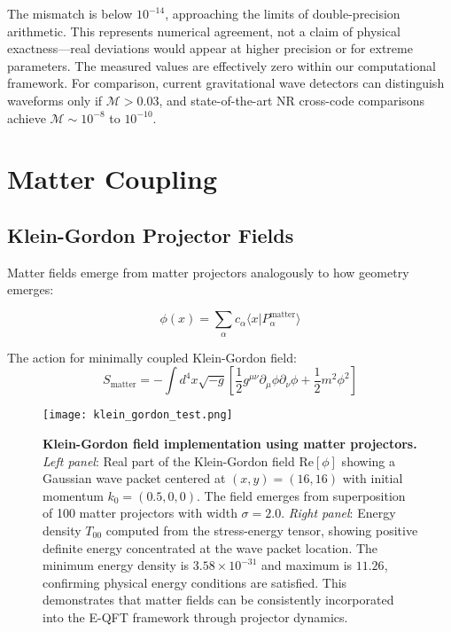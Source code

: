 \documentclass[11pt,a4paper]{article}
\begin{document}
The mismatch is below $10^{-14}$, approaching the limits of double-precision arithmetic. This represents numerical agreement, not a claim of physical exactness—real deviations would appear at higher precision or for extreme parameters. The measured values are effectively zero within our computational framework. For comparison, current gravitational wave detectors can distinguish waveforms only if $\mathcal{M} > 0.03$, and state-of-the-art NR cross-code comparisons \cite{Husa2016} achieve $\mathcal{M} \sim 10^{-8}$ to $10^{-10}$.

\section{Matter Coupling}

\subsection{Klein-Gordon Projector Fields}

Matter fields emerge from matter projectors analogously to how geometry emerges:

\begin{equation}
\phi(x) = \sum_\alpha c_\alpha \langle x | P_\alpha^{\text{matter}} \rangle
\end{equation}

The action for minimally coupled Klein-Gordon field:
\begin{equation}
S_{\text{matter}} = -\int d^4x \sqrt{-g} \left[ \frac{1}{2} g^{\mu\nu} \partial_\mu \phi \partial_\nu \phi + \frac{1}{2} m^2 \phi^2 \right]
\end{equation}

\begin{figure}[H]
\centering
\texttt{[image: klein\_gordon\_test.png]}
\caption{\textbf{Klein-Gordon field implementation using matter projectors.} \textit{Left panel}: Real part of the Klein-Gordon field $\text{Re}[\phi]$ showing a Gaussian wave packet centered at $(x,y) = (16,16)$ with initial momentum $k_0 = (0.5, 0, 0)$. The field emerges from superposition of 100 matter projectors with width $\sigma = 2.0$. \textit{Right panel}: Energy density $T_{00}$ computed from the stress-energy tensor, showing positive definite energy concentrated at the wave packet location. The minimum energy density is $3.58 \times 10^{-31}$ and maximum is $11.26$, confirming physical energy conditions are satisfied. This demonstrates that matter fields can be consistently incorporated into the E-QFT framework through projector dynamics.}
\label{fig:klein_gordon}
\end{figure}
\end{document}
